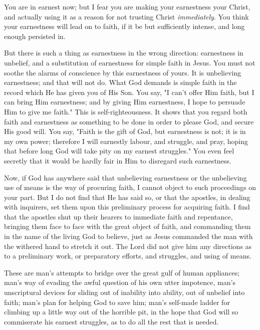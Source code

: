 \documentclass[
]{book}
\begin{document}
You are in earnest now; but I fear you are making your earnestness your Christ, and actually using it as a reason for not trusting Christ \emph{immediately}. You think your earnestness will lead on to faith, if it be but sufficiently intense, and long enough persisted in.

But there is such a thing as earnestness in the wrong direction: earnestness in unbelief, and a substitution of earnestness for simple faith in Jesus. You must not soothe the alarms of conscience by this earnestness of yours. It is unbelieving earnestness; and that will not do. What God demands is simple faith in the record which He has given you of His Son. You say, "I can't offer Him faith, but I can bring Him earnestness; and by giving Him earnestness, I hope to persuade Him to give me faith." This is self-righteousness. It shows that you regard both faith and earnestness as something to be done in order to please God, and secure His good will. You say, "Faith is the gift of God, but earnestness is not; it is in my own power; therefore I will earnestly labour, and struggle, and pray, hoping that before long God will take pity on my earnest struggles." You even feel secretly that it would be hardly fair in Him to disregard such earnestness.

Now, if God has anywhere said that unbelieving earnestness or the unbelieving use of means is the way of procuring faith, I cannot object to such proceedings on your part. But I do not find that He has said so, or that the apostles, in dealing with inquirers, set them upon this preliminary process for acquiring faith. I find that the apostles shut up their hearers to immediate faith and repentance, bringing them face to face with the great object of faith, and commanding them in the name of the living God to believe, just as Jesus commanded the man with the withered hand to stretch it out. The Lord did not give him any directions as to a preliminary work, or preparatory efforts, and struggles, and using of means.

These are man's attempts to bridge over the great gulf of human appliances; man's way of evading the awful question of his own utter impotence, man's unscriptural devices for sliding out of inability into ability, out of unbelief into faith; man's plan for helping God to save him; man's self-made ladder for climbing up a little way out of the horrible pit, in the hope that God will so commiserate his earnest struggles, as to do all the rest that is needed.
\end{document}
